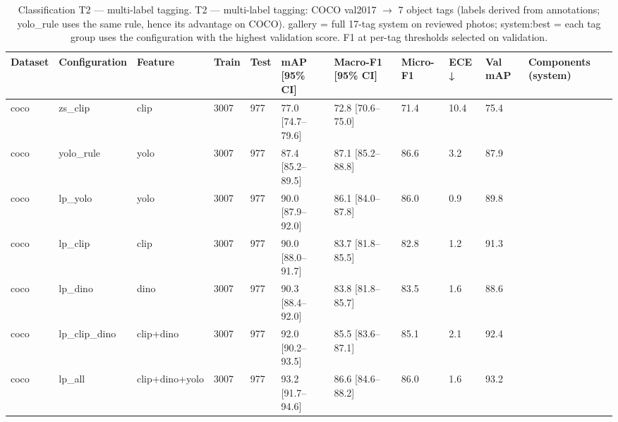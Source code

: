 \begin{table}[ht]
\centering
\small
\caption{Classification T2 — multi-label tagging. T2 — multi-label tagging: COCO val2017 $\rightarrow$ 7 object tags (labels derived from annotations; yolo\_rule uses the same rule, hence its advantage on COCO). gallery = full 17-tag system on reviewed photos; system:best = each tag group uses the configuration with the highest validation score. F1 at per-tag thresholds selected on validation.}
\begin{tabular}{lllllllllll}
\toprule
Dataset & Configuration & Feature & Train & Test & mAP [95\% CI] & Macro-F1 [95\% CI] & Micro-F1 & ECE ↓ & Val mAP & Components (system) \\
\midrule
coco & zs\_clip & clip & 3007 & 977 & 77.0 [74.7–79.6] & 72.8 [70.6–75.0] & 71.4 & 10.4 & 75.4 &  \\
coco & yolo\_rule & yolo & 3007 & 977 & 87.4 [85.2–89.5] & 87.1 [85.2–88.8] & 86.6 & 3.2 & 87.9 &  \\
coco & lp\_yolo & yolo & 3007 & 977 & 90.0 [87.9–92.0] & 86.1 [84.0–87.8] & 86.0 & 0.9 & 89.8 &  \\
coco & lp\_clip & clip & 3007 & 977 & 90.0 [88.0–91.7] & 83.7 [81.8–85.5] & 82.8 & 1.2 & 91.3 &  \\
coco & lp\_dino & dino & 3007 & 977 & 90.3 [88.4–92.0] & 83.8 [81.8–85.7] & 83.5 & 1.6 & 88.6 &  \\
coco & lp\_clip\_dino & clip+dino & 3007 & 977 & 92.0 [90.2–93.5] & 85.5 [83.6–87.1] & 85.1 & 2.1 & 92.4 &  \\
coco & lp\_all & clip+dino+yolo & 3007 & 977 & 93.2 [91.7–94.6] & 86.6 [84.6–88.2] & 86.0 & 1.6 & 93.2 &  \\
\bottomrule
\end{tabular}
\end{table}

